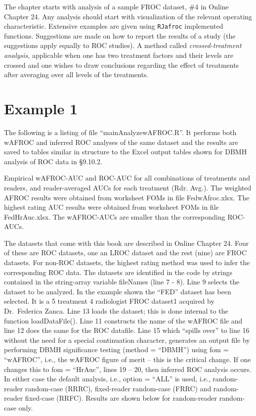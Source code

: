 \documentclass[
]{book}
\begin{document}
The chapter starts with analysis of a sample FROC dataset, \#4 in Online Chapter 24. Any analysis should start with visualization of the relevant operating characteristic. Extensive examples are given using \texttt{RJafroc} implemented functions. Suggestions are made on how to report the results of a study (the suggestions apply equally to ROC studies). A method called \emph{crossed-treatment analysis}, applicable when one has two treatment factors and their levels are crossed and one wishes to draw conclusions regarding the effect of treatments after averaging over all levels of the treatments.

\hypertarget{analyzing-froc-data-example1}{%
\section{Example 1}\label{analyzing-froc-data-example1}}

The following is a listing of file ``mainAnalyzewAFROC.R''. It performs both wAFROC and inferred ROC analyses of the same dataset and the results are saved to tables similar in structure to the Excel output tables shown for DBMH analysis of ROC data in §9.10.2.

Empirical wAFROC-AUC and ROC-AUC for all combinations of treatments and readers, and reader-averaged AUCs for each treatment (Rdr. Avg.). The weighted AFROC results were obtained from worksheet FOMs in file FedwAfroc.xlsx. The highest rating AUC results were obtained from worksheet FOMs in file FedHrAuc.xlsx. The wAFROC-AUCs are smaller than the corresponding ROC-AUCs.

The datasets that come with this book are described in Online Chapter 24. Four of these are ROC datasets, one an LROC dataset and the rest (nine) are FROC datasets. For non-ROC datasets, the highest rating method was used to infer the corresponding ROC data. The datasets are identified in the code by strings contained in the string-array variable fileNames (line 7 - 8). Line 9 selects the dataset to be analyzed. In the example shown the ``FED'' dataset has been selected. It is a 5 treatment 4 radiologist FROC dataset1 acquired by Dr.~Federica Zanca. Line 13 loads the dataset; this is done internal to the function loadDataFile(). Line 11 constructs the name of the wAFROC file and line 12 does the same for the ROC datafile. Line 15 which ``spills over'' to line 16 without the need for a special continuation character, generates an output file by performing DBMH significance testing (method = ``DBMH'') using fom = ``wAFROC'', i.e., the wAFROC figure of merit -- this is the critical change. If one changes this to fom = ``HrAuc'', lines 19 -- 20, then inferred ROC analysis occurs. In either case the default analysis, i.e., option = ``ALL'' is used, i.e., random-reader random-case (RRRC), fixed-reader random-case (FRRC) and random-reader fixed-case (RRFC). Results are shown below for random-reader random-case only.
\end{document}

